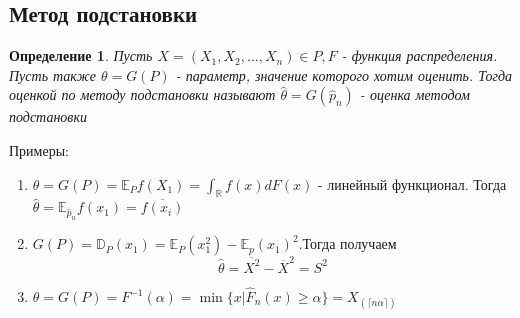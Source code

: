 \documentclass[a4paper,12pt]{article}
\newcommand{\expec}{\mathbb{E}}
\newcommand{\disp}{\mathbb{D}}
\newcommand{\orst}[2]{#1_{(#2)}}
\newcommand{\sample}{X_1, X_2, ..., X_n}
\newcommand{\R}{\mathbb{R}}
\newtheorem{dfn}{Определение}[section]
\theoremstyle{named}
\begin{document}
\subsection{Метод подстановки}
\begin{dfn}
    Пусть $X = (\sample) \in P, F$ - функция распределения. Пусть также $\theta = G(P)$ - 
    параметр, значение которого хотим оценить. Тогда оценкой по методу подстановки называют 
    $\hat\theta = G(\hat p_n)$ - оценка методом подстановки    
\end{dfn}
Примеры:
\begin{enumerate}
    \item $\theta = G(P) = \expec_P f(X_1) = \int_\R f(x) dF(x)$ - линейный функционал. Тогда $\hat\theta = \expec_{\hat p_n} f(x_1) 
    = \overline{f(x_i)}$
    \item $G(P) = \disp_P (x_1) = \expec_P(x_1^2) - \expec_p(x_1)^2$.Тогда получаем 
    $$
        \hat \theta = \overline{X^2} - \overline{X}^2 = S^2
    $$
    \item $\theta = G(P) = F^{-1}(\alpha) = \min \{x | \hat F_n(x) \geq \alpha \} = \orst{X}{\lceil n\alpha \rceil}$
\end{enumerate}
\end{document}
